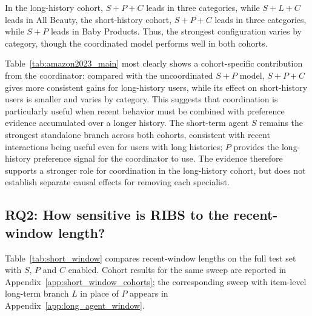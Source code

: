 ﻿\documentclass[sigconf,anonymous,review]{acmart}
\begin{document}
In the long-history cohort, $S+P+C$ leads in three categories, while $S+L+C$ leads in All Beauty, the short-history cohort, $S+P+C$ leads in three categories, while $S+P$ leads in Baby Products. Thus, the strongest configuration varies by category, though the coordinated model performs well in both cohorts.

Table~\ref{tab:amazon2023_main} most clearly shows a cohort-specific contribution from the coordinator: compared with the uncoordinated $S+P$ model, $S+P+C$ gives more consistent gains for long-history users, while its effect on short-history users is smaller and varies by category. This suggests that coordination is particularly useful when recent behavior must be combined with preference evidence accumulated over a longer history. The short-term agent $S$ remains the strongest standalone branch across both cohorts, consistent with recent interactions being useful even for users with long histories; $P$ provides the long-history preference signal for the coordinator to use.  The evidence therefore supports a stronger role for coordination in the long-history cohort, but does not establish separate causal effects for removing each specialist.





\subsection{RQ2: How sensitive is RIBS to the recent-window length?}

\label{sec:window_experiments}


Table~\ref{tab:short_window} compares recent-window lengths on the full test set with $S$, $P$ and $C$ enabled. Cohort results for the same sweep are reported in Appendix~\ref{app:short_window_cohorts}; the corresponding sweep with item-level long-term branch $L$ in place of $P$ appears in Appendix~\ref{app:long_agent_window}.
\end{document}
